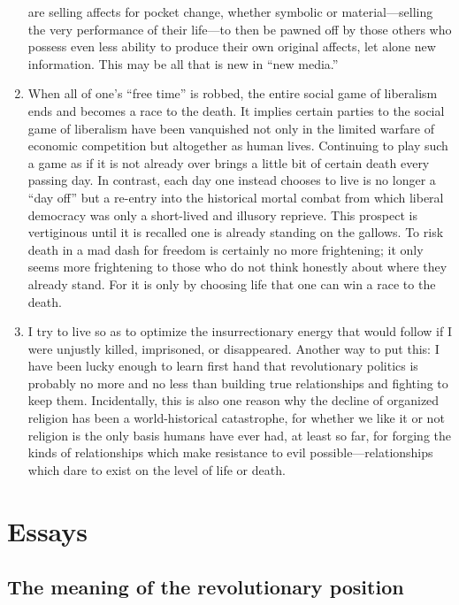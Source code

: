 \documentclass[a4paper,12pt,margin=.5in]{article}
\begin{document}
\begin{enumerate}
  are selling affects for pocket change, whether symbolic or
  material---selling the very performance of their life---to then be
  pawned off by those others who possess even less ability to produce
  their own original affects, let alone new information. This may be all
  that is new in ``new media.''
\item
  When all of one's ``free time'' is robbed, the entire social game of
  liberalism ends and becomes a race to the death. It implies certain
  parties to the social game of liberalism have been vanquished not only
  in the limited warfare of economic competition but altogether as human
  lives. Continuing to play such a game as if it is not already over
  brings a little bit of certain death every passing day. In contrast,
  each day one instead chooses to live is no longer a ``day off'' but a
  re-entry into the historical mortal combat from which liberal
  democracy was only a short-lived and illusory reprieve. This prospect
  is vertiginous until it is recalled one is already standing on the
  gallows. To risk death in a mad dash for freedom is certainly no more
  frightening; it only seems more frightening to those who do not think
  honestly about where they already stand. For it is only by choosing
  life that one can win a race to the death.
\item
  I try to live so as to optimize the insurrectionary energy that would
  follow if I were unjustly killed, imprisoned, or disappeared. Another
  way to put this: I have been lucky enough to learn first hand that
  revolutionary politics is probably no more and no less than building
  true relationships and fighting to keep them. Incidentally, this is
  also one reason why the decline of organized religion has been a
  world-historical catastrophe, for whether we like it or not religion
  is the only basis humans have ever had, at least so far, for forging
  the kinds of relationships which make resistance to evil
  possible---relationships which dare to exist on the level of life or
  death.
\end{enumerate}

\section{Essays}\label{essays}

\subsection{The meaning of the revolutionary
position}\label{the-meaning-of-the-revolutionary-position}
\end{document}
